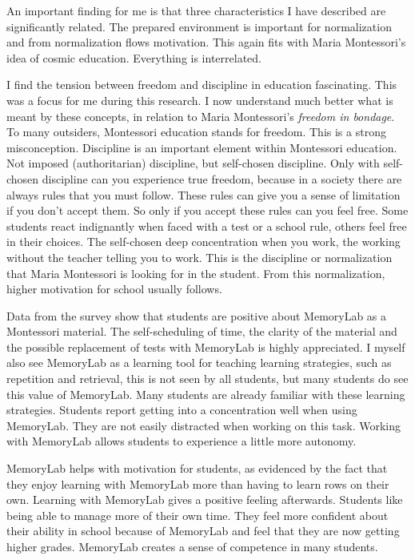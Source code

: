 \documentclass[12pt, a4paper]{article}
\begin{document}
{{An important finding for me is that three characteristics I have described are significantly related. The prepared environment is important for normalization and from normalization flows motivation. This again fits with Maria Montessori's idea of cosmic education. Everything is interrelated.

I find the tension between freedom and discipline in education fascinating. This was a focus for me during this research. I now understand much better what is meant by these concepts, in relation to Maria Montessori's \emph{freedom in bondage}. To many outsiders, Montessori education stands for freedom. This is a strong misconception. Discipline is an important element within Montessori education. Not imposed (authoritarian) discipline, but self-chosen discipline. Only with self-chosen discipline can you experience true freedom, because in a society there are always rules that you must follow. These rules can give you a sense of limitation if you don't accept them. So only if you accept these rules can you feel free. Some students react indignantly when faced with a test or a school rule, others feel free in their choices. The self-chosen deep concentration when you work, the working without the teacher telling you to work. This is the discipline or normalization that Maria Montessori is looking for in the student. From this normalization, higher motivation for school usually follows.  

Data from the survey show that students are positive about MemoryLab as a Montessori material. The self-scheduling of time, the clarity of the material and the possible replacement of tests with MemoryLab is highly appreciated. I myself also see MemoryLab as a learning tool for teaching learning strategies, such as repetition and retrieval, this is not seen by all students, but many students do see this value of MemoryLab. Many students are already familiar with these learning strategies. Students report getting into a concentration well when using MemoryLab. They are not easily distracted when working on this task. Working with MemoryLab allows students to experience a little more autonomy.

MemoryLab helps with motivation for students, as evidenced by the fact that they enjoy learning with MemoryLab more than having to learn rows on their own. Learning with MemoryLab gives a positive feeling afterwards. Students like being able to manage more of their own time. They feel more confident about their ability in school because of MemoryLab and feel that they are now getting higher grades. MemoryLab creates a sense of competence in many students.

}}
\end{document}
